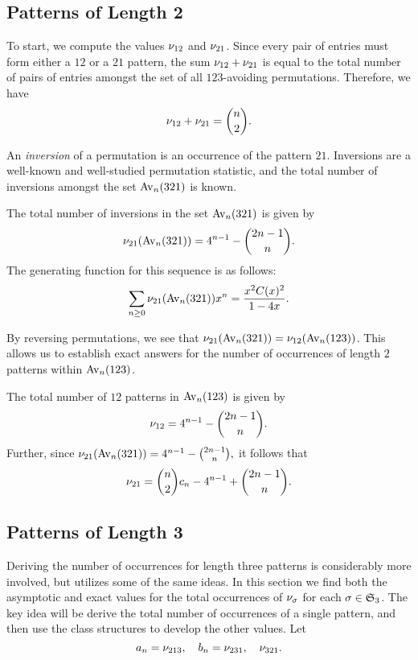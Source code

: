   \subsection{Patterns of Length 2}  

    To start, we compute the values $\nu_{12}$ and $\nu_{21}$. Since every pair
    of entries must form either a $12$ or a $21$ pattern, the sum $\nu_{12} +
    \nu_{21}$ is equal to the total number of pairs of entries amongst the set
    of all $123$-avoiding permutations. Therefore, we have 
    $$ \nu_{12} + \nu_{21} = \binom{n}{2}.$$

    An \emph{inversion}  of a permutation is an occurrence
    of the pattern $21$. Inversions are a well-known and well-studied
    permutation statistic, and the total number of inversions amongst the set
    $\operatorname{{Av}}_n(321)$ is known. 

    \begin{theorem} 
      The total number of inversions in the set $\operatorname{{Av}}_n(321)$ is given by 
      $$ \nu_{21}(\operatorname{{Av}}_n(321)) = 4^{n-1} - \binom{2n - 1}{n}.$$
      The generating function for this sequence is as follows:
      $$ \sum_{n \geq 0} \nu_{21}(\operatorname{{Av}}_n(321)) x^n = 
        \frac{x^2 C(x)^2}{1 - 4x}.$$
    \end{theorem}

    By reversing permutations, we see that $\nu_{21}(\operatorname{{Av}}_n(321)) =
    \nu_{12}(\operatorname{{Av}}_n(123))$. This allows us to establish exact answers for the
    number of occurrences of length $2$ patterns within $\operatorname{{Av}}_n(123)$. 

    \begin{proposition} \label{prop:2-patterns}
      The total number of $12$ patterns in $\operatorname{{Av}}_n(123)$ is given by 
      $$ \nu_{12} = 4^{n-1} - \binom{2n - 1}{n}.$$
      Further, since 
      $ \nu_{21}(\operatorname{{Av}}_n(321)) = 4^{n-1} - \binom{2n - 1}{n},$
      it follows that 
      $$ \nu_{21} = \binom{n}{2} c_n - 4^{n-1} + \binom{2n - 1}{n}.$$
    \end{proposition}


  \subsection{Patterns of Length 3}

    Deriving the number of occurrences for length three patterns is considerably
    more involved, but utilizes some of the same ideas. In this section we find
    both the asymptotic and exact values for the total occurrences of $\nu_\sigma$
    for each $\sigma \in \mathfrak{S}_3$.  The key idea will be derive the total number of
    occurrences of a single pattern, and then use the class structures to develop
    the other values. 
    Let 
    $$a_n = \nu_{213}, \quad b_n = \nu_{231}, \quad \nu_{321}.$$



